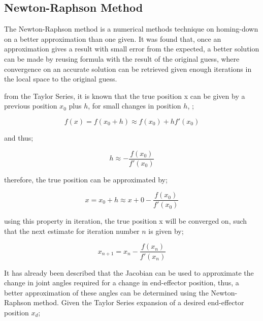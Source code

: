 \documentclass[12pt,openany,a4paper]{book}
\begin{document}
\subsection{Newton-Raphson Method}
The Newton-Raphson method is a numerical methods technique on homing-down on a better approximation than one given. It was found that, once an approximation gives a result with small error from the expected, a better solution can be made by reusing formula with the result of the original guess, where convergence on an accurate solution can be retrieved given enough iterations in the local space to the original guess.

from the Taylor Series, it is known that the true position x can be given by a previous position $x_0$ plus $h$, for small changes in position $h$, ;

\vspace{\baselineskip}
\begin{equation}
f(x) = f(x_0 + h) \approx f(x_0) + h f'(x_0)
\end{equation}

\vspace{\baselineskip}
and thus;

\vspace{\baselineskip}
\begin{equation}
h \approx - \frac{f(x_0)}{f'(x_0)}
\end{equation}

\vspace{\baselineskip}
therefore, the true position can be approximated by;

\vspace{\baselineskip}
\begin{equation}
x = x_0 + h \approx x+0 - \frac{f(x_0)}{f'(x_0)}
\end{equation}

\vspace{\baselineskip}
using this property in iteration, the true position x will be converged on, such that the next estimate for iteration number $n$ is given by;

\vspace{\baselineskip}
\begin{equation}
x_{n+1} = x_n - \frac{f(x_n)}{f'(x_n)}
\end{equation}

\vspace{\baselineskip}
It has already been described that the Jacobian can be used to approximate the change in joint angles required for a change in end-effector position, thus, a better approximation of these angles can be determined using the Newton-Raphson method. Given the Taylor Series expansion of a desired end-effector position $x_d$;
\end{document}
